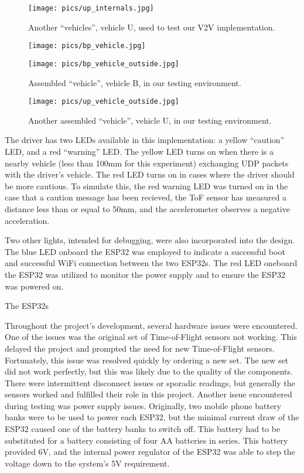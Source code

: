 \documentclass[conference]{IEEEtran}
\begin{document}
\begin{figure}[htbp]
\centerline{\texttt{[image: pics/up\_internals.jpg]}}
\caption{Another ``vehicles'', vehicle U, used to test our V2V implementation.}
\label{vehicle_up}
\end{figure}

\begin{figure}[htbp]
\centerline{\texttt{[image: pics/bp\_vehicle.jpg]}}
\centerline{\texttt{[image: pics/bp\_vehicle\_outside.jpg]}}
\caption{Assembled ``vehicle'', vehicle B, in our testing environment.}
\label{bp_outside}
\end{figure}

\begin{figure}[htbp]
\centerline{\texttt{[image: pics/up\_vehicle\_outside.jpg]}}
\caption{Another assembled ``vehicle'', vehicle U, in our testing environment.}
\label{up_outside}
\end{figure}

The driver has two LEDs available in this implementation: a yellow ``caution''
LED, and a red ``warning'' LED. The yellow LED turns on when there is a nearby vehicle
(less than 100mm for this experiment) exchanging UDP packets with the driver's vehicle.
The red LED turns on in cases where the driver should be more cautious. To simulate this,
the red warning LED was turned on in the case that a caution message has been recieved, 
the ToF sensor has measured a distance less than or equal to 50mm, and the accelerometer
observes a negative acceleration.

Two other lights, intended for debugging, were also incorporated into the design. The blue
LED onboard the ESP32 was employed to indicate a successful boot and successful WiFi
connection between the two ESP32s. The red LED oneboard the ESP32 was utilized to 
monitor the power supply and to ensure the ESP32 was powered on.

The ESP32s 

Throughout the project's development, several hardware issues were encountered.
One of the issues was the original set of Time-of-Flight sensors not working.
This delayed the project and prompted the need for new Time-of-Flight sensors.
Fortunately, this issue was resolved quickly by ordering a new set. The new set
did not work perfectly, but this was likely due to the quality of the components.
There were intermittent disconnect issues or sporadic readings, but generally
the sensors worked and fulfilled their role in this project. Another issue encountered
during testing was power supply issues. Originally, two mobile phone battery banks were
to be used to power each ESP32, but the minimal current draw of the ESP32 caused one
of the battery banks to switch off. This battery had to be substituted for a
battery consisting of four AA batteries in series. This battery provided 6V, and the
internal power regulator of the ESP32 was able to step the voltage down to the system's
5V requirement.
\end{document}
